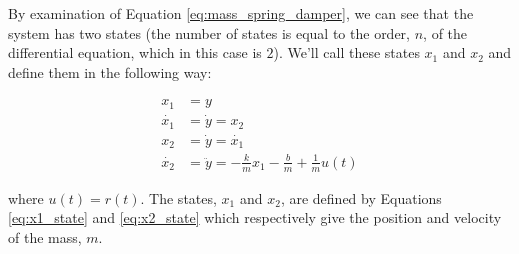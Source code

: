 \documentclass{article}
\begin{document}
By examination of Equation \ref{eq:mass_spring_damper}, we can see that the 
system has two states (the number of states is equal to the order, $n$, of the
differential equation, which in this case is $2$). We'll call these states 
$x_1$ and $x_2$ and define them in the following way:

\begin{align}
          x_1 &= y \nonumber \\
    \label{eq:x1_state} 
    \dot{x_1} &= \dot{y} = x_2 \\
          x_2 &= \dot{y} = \dot{x_1} \nonumber \\  
    \label{eq:x2_state}
    \dot{x_2} &= \ddot{y} = -\frac{k}{m} x_1 - \frac{b}{m} + \frac{1}{m} u(t)
\end{align}

\noindent where $u(t) = r(t)$. The states, $x_1$ and $x_2$, are defined by 
Equations \ref{eq:x1_state} and \ref{eq:x2_state} which respectively give the 
position and velocity of the mass, $m$.



\end{document}
